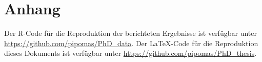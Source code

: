 \documentclass[11pt, twoside, a4paper]{book}		%
\begin{document}
\chapter[Anhang: Online-Material]{Anhang}

Der R-Code für die Reproduktion der berichteten Ergebnisse ist verfügbar unter \url{https://github.com/pipomas/PhD_data}.
Der \LaTeX-Code für die Reproduktion dieses Dokuments ist verfügbar unter \url{https://github.com/pipomas/PhD_thesis}.
\end{document}
